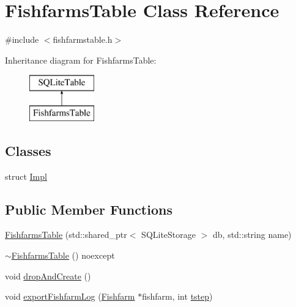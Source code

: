 \hypertarget{class_fishfarms_table}{}\section{Fishfarms\+Table Class Reference}
\label{class_fishfarms_table}


{\ttfamily \#include $<$fishfarmstable.\+h$>$}

Inheritance diagram for Fishfarms\+Table\+:\begin{figure}[H]
\begin{center}
\leavevmode
\includegraphics[height=2.000000cm]{df/d09/class_fishfarms_table}
\end{center}
\end{figure}
\subsection*{Classes}
\begin{DoxyCompactItemize}
\item 
struct \mbox{\hyperlink{struct_fishfarms_table_1_1_impl}{Impl}}
\end{DoxyCompactItemize}
\subsection*{Public Member Functions}
\begin{DoxyCompactItemize}
\item 
\mbox{\hyperlink{class_fishfarms_table_ae2712d8cb76f1ddbbea5ec4bd5659a19}{Fishfarms\+Table}} (std\+::shared\+\_\+ptr$<$ S\+Q\+Lite\+Storage $>$ db, std\+::string name)
\item 
\mbox{\hyperlink{class_fishfarms_table_a260c1d5c2aa4eb94d78ab686a54ac9c7}{$\sim$\+Fishfarms\+Table}} () noexcept
\item 
void \mbox{\hyperlink{class_fishfarms_table_a88e7280ea0ff04a2b257c0977030d9d3}{drop\+And\+Create}} ()
\item 
void \mbox{\hyperlink{class_fishfarms_table_abb6b0a8fa276e4ec032f80f54526da27}{export\+Fishfarm\+Log}} (\mbox{\hyperlink{class_fishfarm}{Fishfarm}} $\ast$fishfarm, int \mbox{\hyperlink{thread__vessels_8cpp_a84bc73d278de929ec9974e1a95d9b23a}{tstep}})
\end{DoxyCompactItemize}
